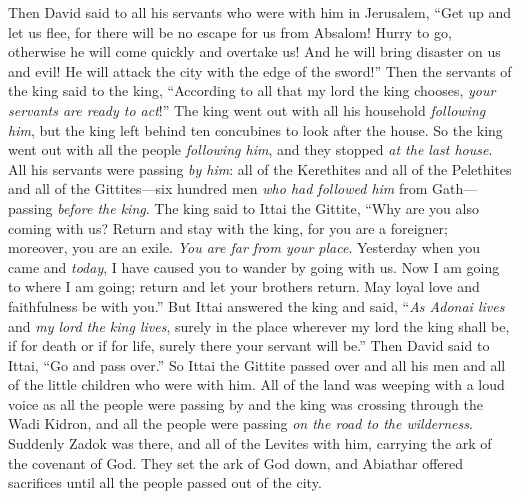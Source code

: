 \begin{biblechapter}
\verse Then David said to all his servants who were with him in Jerusalem, “Get up and let us flee, for there will be no escape for us from Absalom! Hurry to go, otherwise he will come quickly and overtake us! And he will bring disaster on us and evil! He will attack the city with the edge of the sword!”
\verse Then the servants of the king said to the king, “According to all that my lord the king chooses, \textit{your servants are ready to act}!”
\verse The king went out with all his household \textit{following him}, but the king left behind ten concubines to look after the house.
\verse So the king went out with all the people \textit{following him}, and they stopped \textit{at the last house}.
\verse All his servants were passing \textit{by him}: all of the Kerethites and all of the Pelethites and all of the Gittites—six hundred men \textit{who had followed him} from Gath—passing \textit{before the king}.
\verse The king said to Ittai the Gittite, “Why are you also coming with us? Return and stay with the king, for you are a foreigner; moreover, you are an exile. \textit{You are far from your place}.
\verse Yesterday when you came and \textit{today}, I have caused you to wander by going with us. Now I am going to where I am going; return and let your brothers return. May loyal love and faithfulness be with you.”
\verse But Ittai answered the king and said, “\textit{As Adonai lives} and \textit{my lord the king lives}, surely in the place wherever my lord the king shall be, if for death or if for life, surely there your servant will be.”
\verse Then David said to Ittai, “Go and pass over.” So Ittai the Gittite passed over and all his men and all of the little children who were with him.
\verse All of the land was weeping with a loud voice as all the people were passing by and the king was crossing through the Wadi Kidron, and all the people were passing \textit{on the road to the wilderness}.
 Suddenly Zadok was there, and all of the Levites with him, carrying the ark of the covenant of God. They set the ark of God down, and Abiathar offered sacrifices until all the people passed out of the city.

\end{biblechapter}
